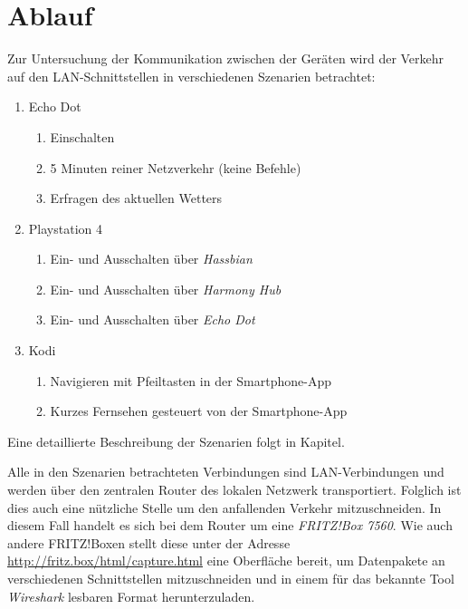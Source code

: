 \section{Ablauf}\label{sec:ablauf}
Zur Untersuchung der Kommunikation zwischen der Geräten wird der Verkehr auf den LAN-Schnittstellen in verschiedenen Szenarien betrachtet:

\begin{enumerate}
    \item Echo Dot
    \begin{enumerate}[label*=\arabic*.]
        \item Einschalten
        \item 5 Minuten reiner Netzverkehr (keine Befehle)
        \item Erfragen des aktuellen Wetters
    \end{enumerate}
    \item Playstation 4
    \begin{enumerate}[label*=\arabic*.]
        \item Ein- und Ausschalten über \textit{Hassbian}
        \item Ein- und Ausschalten über \textit{Harmony Hub}
        \item Ein- und Ausschalten über \textit{Echo Dot}
    \end{enumerate}
    \item Kodi
    \begin{enumerate}[label*=\arabic*.]
        \item Navigieren mit Pfeiltasten in der Smartphone-App
        \item Kurzes Fernsehen gesteuert von der Smartphone-App
    \end{enumerate}
\end{enumerate}

Eine detaillierte Beschreibung der Szenarien folgt in Kapitel. 


Alle in den Szenarien betrachteten Verbindungen sind LAN-Verbindungen und werden über den zentralen Router des lokalen Netzwerk transportiert.
Folglich ist dies auch eine nützliche Stelle um den anfallenden Verkehr mitzuschneiden.
In diesem Fall handelt es sich bei dem Router um eine \textit{FRITZ!Box 7560}\cite{FRITZBox29:online}.
Wie auch andere FRITZ!Boxen stellt diese unter der Adresse \url{http://fritz.box/html/capture.html} eine Oberfläche bereit,
um Datenpakete an verschiedenen Schnittstellen mitzuschneiden
und in einem für das bekannte Tool \textit{Wireshark} lesbaren Format herunterzuladen.

